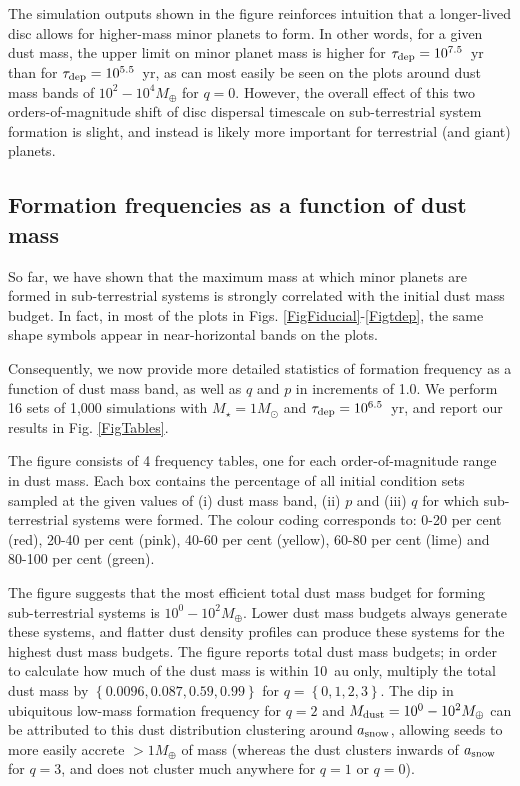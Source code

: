\documentclass[useAMS,usenatbib]{mn2e}
\begin{document}
The simulation outputs shown in the figure reinforces intuition that a longer-lived disc allows for higher-mass minor planets to form. In other words, for a given dust mass, the upper limit on minor planet mass is higher for $\tau_{\rm dep} = 10^{7.5}$~yr than for $\tau_{\rm dep} = 10^{5.5}$~yr, as can most easily be seen on the plots around dust mass bands of $10^2-10^4M_{\oplus}$ for $q=0$. However, the overall effect of this two orders-of-magnitude shift of disc dispersal timescale on sub-terrestrial system formation is slight, and instead is likely more important for terrestrial (and giant) planets. 


\subsection{Formation frequencies as a function of dust mass}

So far, we have shown that the maximum mass at which minor planets are formed in sub-terrestrial systems is strongly correlated with the initial dust mass budget. In fact, in most of the plots in Figs. \ref{FigFiducial}-\ref{Figtdep}, the same shape symbols appear in near-horizontal bands on the plots.

Consequently, we now provide more detailed statistics of formation frequency as a function of dust mass band, as well as $q$ and $p$ in increments of 1.0. We perform 16 sets of 1,000 simulations with $M_{\star}=1M_{\odot}$ and $\tau_{\rm dep}=10^{6.5}$~yr, and report our results in Fig. \ref{FigTables}.

The figure consists of 4 frequency tables, one for each order-of-magnitude range in dust mass. Each box contains the percentage of all initial condition sets sampled at the given values of (i) dust mass band, (ii) $p$ and (iii) $q$ for which sub-terrestrial systems were formed. The colour coding corresponds to: 0-20 per cent (red), 20-40 per cent (pink), 40-60 per cent (yellow), 60-80 per cent (lime) and 80-100 per cent (green).

The figure suggests that the most efficient total dust mass budget for forming sub-terrestrial systems is $10^0-10^2M_{\oplus}$. Lower dust mass budgets always generate these systems, and flatter dust density profiles can produce these systems for the highest dust mass budgets. The figure reports total dust mass budgets; in order to calculate how much of the dust mass is within 10~au only, multiply the total dust mass by $\left\lbrace 0.0096, 0.087, 0.59, 0.99 \right\rbrace$ for $q=\left\lbrace 0,1,2,3\right\rbrace$. The dip in ubiquitous low-mass formation frequency for $q=2$ and $M_{\rm dust} = 10^0-10^2M_{\oplus}$ can be attributed to this dust distribution clustering around $a_{\rm snow}$, allowing seeds to more easily accrete $>1M_{\oplus}$ of mass (whereas the dust clusters inwards of $a_{\rm snow}$ for $q=3$, and does not cluster much anywhere for $q=1$ or $q=0$).
\end{document}
